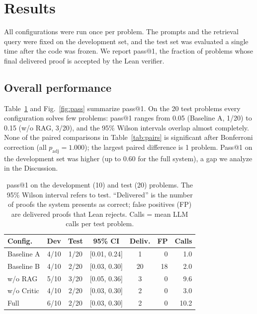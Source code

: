 \section{Results}
\label{sec:results}

All configurations were run once per problem. The prompts and the retrieval query were fixed on the development set, and the
test set was evaluated a single time after the code was frozen. We report pass@1, the fraction of problems whose final
delivered proof is accepted by the Lean verifier.

\subsection{Overall performance}
Table~\ref{tab:main} and Fig.~\ref{fig:pass} summarize pass@1. On the 20 test problems every configuration solves few
problems: pass@1 ranges from 0.05 (Baseline A, 1/20) to 0.15 (w/o RAG,
3/20), and the 95\% Wilson intervals overlap almost completely. None of the paired comparisons in
Table~\ref{tab:pairs} is significant after Bonferroni correction (all $p_{\mathrm{adj}} = 1.000$); the largest paired
difference is 1 problem. Pass@1 on the development set was higher (up to 0.60 for the
full system), a gap we analyze in the Discussion.

\begin{table}[t]
\centering
\caption{pass@1 on the development (10) and test (20) problems. The 95\% Wilson interval refers to test. ``Delivered'' is the number of proofs the system presents as correct; false positives (FP) are delivered proofs that Lean rejects. Calls = mean LLM calls per test problem.}
\label{tab:main}
\footnotesize
\setlength{\tabcolsep}{3pt}
\begin{tabular}{lccccrr}
\hline
Config. & Dev & Test & 95\% CI & Deliv. & FP & Calls \\
\hline
Baseline A & 4/10 & 1/20 & [0.01, 0.24] & 1 & 0 & 1.0 \\
Baseline B & 4/10 & 2/20 & [0.03, 0.30] & 20 & 18 & 2.0 \\
w/o RAG & 5/10 & 3/20 & [0.05, 0.36] & 3 & 0 & 9.6 \\
w/o Critic & 4/10 & 2/20 & [0.03, 0.30] & 2 & 0 & 3.0 \\
Full & 6/10 & 2/20 & [0.03, 0.30] & 2 & 0 & 10.2 \\
\hline
\end{tabular}
\end{table}

